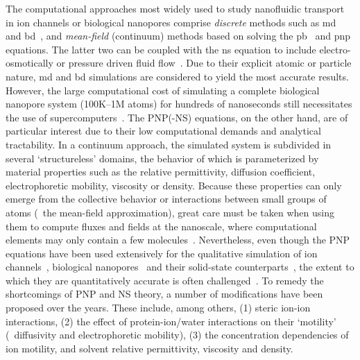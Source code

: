 The computational approaches most widely used to study nanofluidic transport in ion channels or biological
nanopores comprise \emph{discrete} methods such as \gls{md}~\cite{Lynden-Bell-1996,Allen-1999,
Aksimentiev-2005,Luan-2008,Bhattacharya-2011,Zhang-2014,DiMarino-2015,Belkin-2016,Basdevant-2019,Cao-2019} and
\gls{bd}~\cite{Schirmer-1999,Im-2002,Noskov-2004,Millar-2008,Egwolf-2010,DeBiase-2015,Pederson-2015}, and
\emph{mean-field} (continuum) methods based on solving the \gls{pb}~\cite{Grochowski-2008, Baldessari-2008-1}
and \gls{pnp}~\cite{Eisenberg-1996,Gillespie-2002,Simakov-2010} equations. The latter two can be coupled with
the \gls{ns} equation to include electro-osmotically or pressure driven fluid
flow~\cite{Lu-2012,Pederson-2015}. Due to their explicit atomic or particle nature, \gls{md} and \gls{bd}
simulations are considered to yield the most accurate results. However, the large computational cost of
simulating a complete biological nanopore system (100K--1M atoms) for hundreds of nanoseconds still
necessitates the use of supercomputers~\cite{Aksimentiev-2005,Bhattacharya-2011,Wilson-2019,Cao-2019}. The
PNP(-NS) equations, on the other hand, are of particular interest due to their low computational demands and
analytical tractability. In a continuum approach, the simulated system is subdivided in several
`structureless' domains, the behavior of which is parameterized by material properties such as the relative
permittivity, diffusion coefficient, electrophoretic mobility, viscosity or density. Because these properties
can only emerge from the collective behavior or interactions between small groups of atoms (\ie~the mean-field
approximation), great care must be taken when using them to compute fluxes and fields at the nanoscale, where
computational elements may only contain a few molecules~\cite{Corry-2000,Collins-2012}. Nevertheless, even
though the PNP equations have been used extensively for the qualitative simulation of ion
channels~\cite{Im-2002,Furini-2006,Liu-2015}, biological nanopores~\cite{Simakov-2010,Pederson-2015,
Aguilella-Arzo-2017,Simakov-2018} and their solid-state counterparts~\cite{Cervera-2005,White-2008,
Chaudhry-2014,Laohakunakorn-2015}, the extent to which they are quantitatively accurate is often
challenged~\cite{Corry-2000,Collins-2012,Maffeo-2012,Thomas-2014,Kim-2015}. To remedy the shortcomings of PNP
and NS theory, a number of modifications have been proposed over the years. These include, among others, (1)
steric ion-ion interactions, (2) the effect of protein-ion/water interactions on their `motility'
(\ie~diffusivity and electrophoretic mobility), (3) the concentration dependencies of ion motility, and
solvent relative permittivity, viscosity and density.

